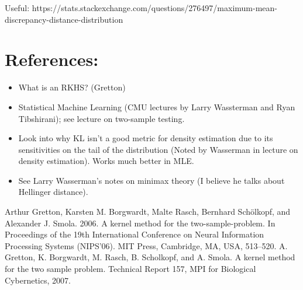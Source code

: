 \documentclass[12pt]{article}
\begin{document}
Useful: https://stats.stackexchange.com/questions/276497/maximum-mean-discrepancy-distance-distribution

\section{References:}
\begin{itemize}
\item What is an RKHS? (Gretton)
\item Statistical Machine Learning (CMU lectures by Larry Wassterman and Ryan Tibshirani); see lecture on two-sample testing. 
\item Look into why KL isn't a good metric for density estimation due to its sensitivities on the tail of the distribution (Noted by Wasserman in lecture on density estimation). Works much better in MLE. 
\item See Larry Wasserman's notes on minimax theory (I believe he talks about Hellinger distance).  
\end{itemize}

\begin{thebibliography}{20}
 Arthur Gretton, Karsten M. Borgwardt, Malte Rasch, Bernhard Schölkopf, and Alexander J. Smola. 2006. A kernel method for the two-sample-problem. In Proceedings of the 19th International Conference on Neural Information Processing Systems (NIPS'06). MIT Press, Cambridge, MA, USA, 513–520.
 A. Gretton, K. Borgwardt, M. Rasch, B. Scholkopf, and A. Smola. A kernel method for the two sample
problem. Technical Report 157, MPI for Biological Cybernetics, 2007.
\end{thebibliography}
\end{document}
